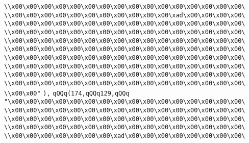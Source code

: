 \verb|\\x00\x00\x00\x00\x00\x00\x00\x00\x00\x00\x00\x00\x00\x00\x00\x00\|\newline
\verb|\\x00\x00\x00\x00\x00\x00\x00\x00\x00\x00\x00\xad\x00\x00\x00\x00\|\newline
\verb|\\x00\x00\x00\x00\x00\x00\x00\x00\x00\x00\x00\x00\x00\x00\x00\x00\|\newline
\verb|\\x00\x00\x00\x00\x00\x00\x00\x00\x00\x00\x00\x00\x00\x00\x00\x00\|\newline
\verb|\\x00\x00\x00\x00\x00\x00\x00\x00\x00\x00\x00\x00\x00\x00\x00\x00\|\newline
\verb|\\x00\x00\x00\x00\x00\x00\x00\x00\x00\x00\x00\x00\x00\x00\x00\x00\|\newline
\verb|\\x00\x00\x00\x00\x00\x00\x00\x00\x00\x00\x00\x00\x00\x00\x00\x00\|\newline
\verb|\\x00\x00\x00\x00\x00\x00\x00\x00\x00\x00\x00\x00\x00\x00\x00\x00\|\newline
\verb|\\x00\x00\x00\x00\x00\x00\x00\x00\x00\x00\x00\x00\x00\x00\x00\x00\|\newline
\verb|\\x00\x00\x00\x00\x00\x00\x00\x00\x00\x00\x00\x00\x00\x00\x00\x00\|\newline
\verb|\\x00\x00"|\newline
\verb|),|\newline
\verb|qQQq(174,qQQq129,qQQq|\newline
\verb|"\x00\x00\x00\x00\x00\x00\x00\x00\x00\x00\x00\x00\x00\x00\x00\x00\|\newline
\verb|\\x00\x00\x00\x00\x00\x00\x00\x00\x00\x00\x00\x00\x00\x00\x00\x00\|\newline
\verb|\\x00\x00\x00\x00\x00\x00\x00\x00\x00\x00\x00\x00\x00\x00\x00\x00\|\newline
\verb|\\x00\x00\x00\x00\x00\x00\x00\x00\x00\x00\x00\x00\x00\x00\x00\x00\|\newline
\verb|\\x00\x00\x00\x00\x00\x00\x00\xad\x00\x00\x00\x00\x00\x00\x00\x00\|\newline
